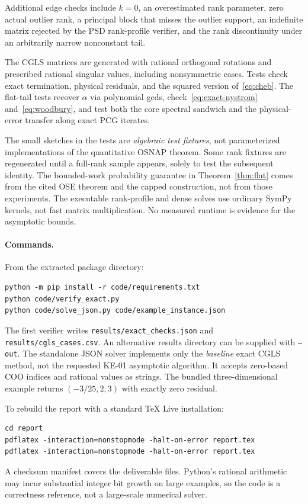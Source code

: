 \documentclass[11pt,a4paper]{article}
\theoremstyle{definition}
\theoremstyle{remark}
\begin{document}
Additional edge checks include $k=0$, an overestimated rank parameter, zero actual outlier rank, a principal block that misses the outlier support, an indefinite matrix rejected by the PSD rank-profile verifier, and the rank discontinuity under an arbitrarily narrow nonconstant tail.

The CGLS matrices are generated with rational orthogonal rotations and prescribed rational singular values, including nonsymmetric cases. Tests check exact termination, physical residuals, and the squared version of~\eqref{eq:cheb}. The flat-tail tests recover $\alpha$ via polynomial gcds, check~\eqref{eq:exact-nystrom} and~\eqref{eq:woodbury}, and test both the core spectral sandwich and the physical-error transfer along exact PCG iterates.

The small sketches in the tests are \emph{algebraic test fixtures}, not parameterized implementations of the quantitative OSNAP theorem. Some rank fixtures are regenerated until a full-rank sample appears, solely to test the subsequent identity. The bounded-work probability guarantee in Theorem~\ref{thm:flat} comes from the cited OSE theorem and the capped construction, not from those experiments. The executable rank-profile and dense solves use ordinary SymPy kernels, not fast matrix multiplication. No measured runtime is evidence for the asymptotic bounds.

\paragraph{Commands.}
From the extracted package directory:
\begin{verbatim}
python -m pip install -r code/requirements.txt
python code/verify_exact.py
python code/solve_json.py code/example_instance.json
\end{verbatim}
The first verifier writes \texttt{results/exact\_checks.json} and
\texttt{results/cgls\_cases.csv}. An alternative results directory can be supplied with \texttt{--out}. The standalone JSON solver implements only the \emph{baseline} exact CGLS method, not the requested KE-01 asymptotic algorithm. It accepts zero-based COO indices and rational values as strings. The bundled three-dimensional example returns $(-3/25,2,3)$ with exactly zero residual.

To rebuild the report with a standard TeX Live installation:
\begin{verbatim}
cd report
pdflatex -interaction=nonstopmode -halt-on-error report.tex
pdflatex -interaction=nonstopmode -halt-on-error report.tex
\end{verbatim}
A checksum manifest covers the deliverable files. Python's rational arithmetic may incur substantial integer bit growth on large examples, so the code is a correctness reference, not a large-scale numerical solver.
\end{document}
